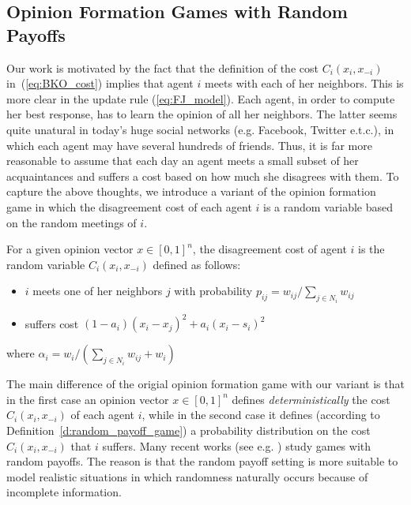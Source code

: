 \subsection{Opinion Formation Games with Random Payoffs}
Our work is motivated by the fact that the definition of the cost $C_i(x_i,x_{-i})$
in~(\ref{eq:BKO_cost}) implies that agent $i$ meets with each of her neighbors. This is more
clear in the update rule (\ref{eq:FJ_model}). Each agent, in order to compute her best response, 
has to learn the opinion of all her neighbors. The latter seems quite unatural in today's
huge social networks (e.g. Facebook, Twitter e.t.c.), in which each agent may have
several hundreds of friends. Thus, it is far more reasonable to assume
that each day an agent meets a small subset of her acquaintances and
suffers a cost based on how much she disagrees with them. To capture the above thoughts,
we introduce a variant of the opinion formation game in which the disagreement cost of each agent 
$i$ is a random variable based on the random meetings of $i$.  

\begin{definition}\label{d:random_payoff_game}
  For a given opinion vector $x \in [0,1]^n$, the disagreement cost of agent $i$
  is the random variable $C_i(x_i,x_{-i})$ defined as follows:
  \begin{itemize}
    \item $i$ meets one of her neighbors $j$ with probability $p_{ij}= w_{ij}/\sum_{j\in N_i}w_{ij}$
    \item suffers cost $(1-a_i)(x_i-x_j)^2 + a_i(x_i-s_i)^2$
  \end{itemize}
  where $\alpha_i = w_i/(\sum_{j\in N_i}w_{ij}+w_i)$
\end{definition}
\noindent The main difference of the origial opinion formation game with our variant is that 
in the first case an opinion vector $x\in [0,1]^n$ defines \emph{deterministically}
the cost $C_i(x_i,x_{-i})$ of each agent $i$, while in the second 
case it defines (according to Definition~\ref{d:random_payoff_game})
a probability distribution on the cost $C_i(x_i,x_{-i})$ that $i$ suffers.
Many recent works (see e.g. \cite{Zhou17,CLL16}) study games
with random payoffs. The reason is that the random payoff setting 
is more suitable to model realistic situations in which 
randomness naturally occurs because of incomplete information.

